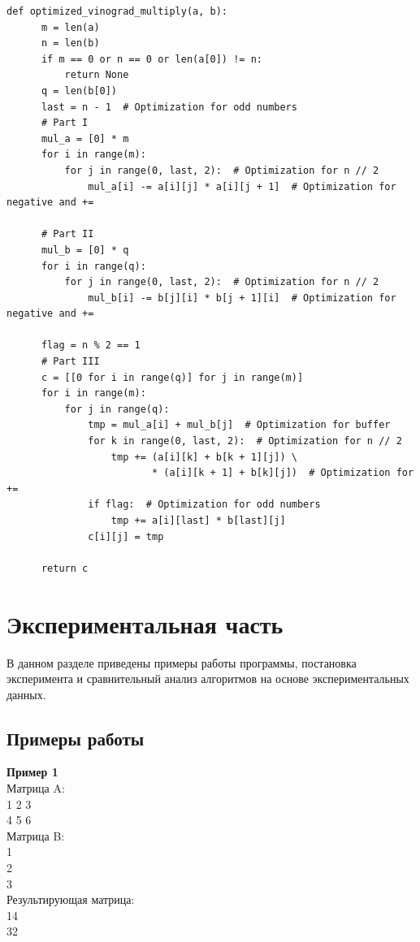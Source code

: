 \documentclass[a4paper,12pt]{report}
\begin{document}
\begin{lstlisting}[caption=Функция умножения матриц оптимизированным алгоритмом Винограда]
  def optimized_vinograd_multiply(a, b):
      m = len(a)
      n = len(b)
      if m == 0 or n == 0 or len(a[0]) != n:
          return None
      q = len(b[0])
      last = n - 1  # Optimization for odd numbers
      # Part I
      mul_a = [0] * m
      for i in range(m):
          for j in range(0, last, 2):  # Optimization for n // 2
              mul_a[i] -= a[i][j] * a[i][j + 1]  # Optimization for negative and +=

      # Part II
      mul_b = [0] * q
      for i in range(q):
          for j in range(0, last, 2):  # Optimization for n // 2
              mul_b[i] -= b[j][i] * b[j + 1][i]  # Optimization for negative and +=

      flag = n % 2 == 1
      # Part III
      c = [[0 for i in range(q)] for j in range(m)]
      for i in range(m):
          for j in range(q):
              tmp = mul_a[i] + mul_b[j]  # Optimization for buffer
              for k in range(0, last, 2):  # Optimization for n // 2
                  tmp += (a[i][k] + b[k + 1][j]) \
                         * (a[i][k + 1] + b[k][j])  # Optimization for +=
              if flag:  # Optimization for odd numbers
                  tmp += a[i][last] * b[last][j]
              c[i][j] = tmp

      return c
\end{lstlisting}



\chapter{Экспериментальная часть}
В данном разделе приведены примеры работы программы, постановка эксперимента и сравнительный анализ алгоритмов на основе экспериментальных данных.
\section{Примеры работы}
\hspace{0.6cm}\textbf {Пример 1}\\
Матрица A:\\
1 2 3\\
4 5 6\\
Матрица B:\\
1\\
2\\
3\\
Результирующая матрица:\\
14\\
32\\
\end{document}
